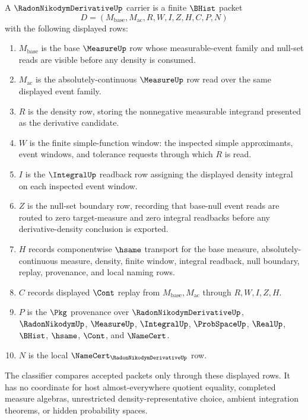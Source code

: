 \begin{definition}
\label{def:radon-nikodym-derivative-carrier}
A $\RadonNikodymDerivativeUp$ carrier is a finite $\BHist$ packet
$$
D=(M_{\mathrm{base}},M_{\mathrm{ac}},R,W,I,Z,H,C,P,N)
$$
with the following displayed rows:
\begin{enumerate}
\item $M_{\mathrm{base}}$ is the base $\MeasureUp$ row whose measurable-event family and null-set reads are visible before any density is consumed.
\item $M_{\mathrm{ac}}$ is the absolutely-continuous $\MeasureUp$ row read over the same displayed event family.
\item $R$ is the density row, storing the nonnegative measurable integrand presented as the derivative candidate.
\item $W$ is the finite simple-function window: the inspected simple approximants, event windows, and tolerance requests through which $R$ is read.
\item $I$ is the $\IntegralUp$ readback row assigning the displayed density integral on each inspected event window.
\item $Z$ is the null-set boundary row, recording that base-null event reads are routed to zero target-measure and zero integral readbacks before any derivative-density conclusion is exported.
\item $H$ records componentwise $\hsame$ transport for the base measure, absolutely-continuous measure, density, finite window, integral readback, null boundary, replay, provenance, and local naming rows.
\item $C$ records displayed $\Cont$ replay from $M_{\mathrm{base}},M_{\mathrm{ac}}$ through $R,W,I,Z,H$.
\item $P$ is the $\Pkg$ provenance over $\RadonNikodymDerivativeUp$, $\RadonNikodymUp$, $\MeasureUp$, $\IntegralUp$, $\ProbSpaceUp$, $\RealUp$, $\BHist$, $\hsame$, $\Cont$, and $\NameCert$.
\item $N$ is the local $\NameCert_{\RadonNikodymDerivativeUp}$ row.
\end{enumerate}
The classifier compares accepted packets only through these displayed rows. It has no coordinate for host almost-everywhere quotient equality, completed measure algebras, unrestricted density-representative choice, ambient integration theorems, or hidden probability spaces.
\end{definition}

